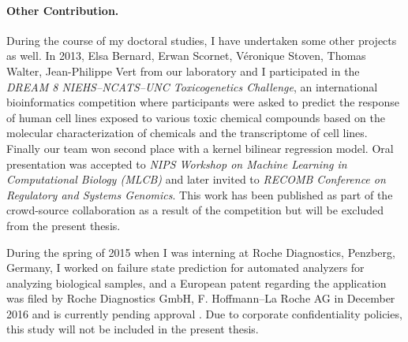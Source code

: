\paragraph{Other Contribution.}

During the course of my doctoral studies, I have undertaken some other projects as well. In 2013, Elsa Bernard, Erwan Scornet, V\'{e}ronique Stoven, Thomas Walter, Jean-Philippe Vert from our laboratory and I participated in the \textit{DREAM 8 NIEHS--NCATS--UNC Toxicogenetics Challenge}, an international bioinformatics competition where participants were asked to predict the response of human cell lines exposed to various toxic chemical compounds based on the molecular characterization of chemicals and the transcriptome of cell lines. Finally our team won second place with a kernel bilinear regression model. Oral presentation was accepted to \textit{NIPS Workshop on Machine Learning in Computational Biology (MLCB)} and later invited to \textit{RECOMB Conference on Regulatory and Systems Genomics}. This work has been published as part of the crowd-source collaboration as a result of the competition \cite{Eduati2015Prediction} but will be excluded from the present thesis.


During the spring of 2015 when I was interning at Roche Diagnostics, Penzberg, Germany, I worked on failure state prediction for automated analyzers for analyzing biological samples, and a European patent regarding the application was filed by Roche Diagnostics GmbH, F. Hoffmann--La Roche AG in December 2016 and is currently pending approval \cite{Jiao2016Failure}. Due to corporate confidentiality policies, this study will not be included in the present thesis.
